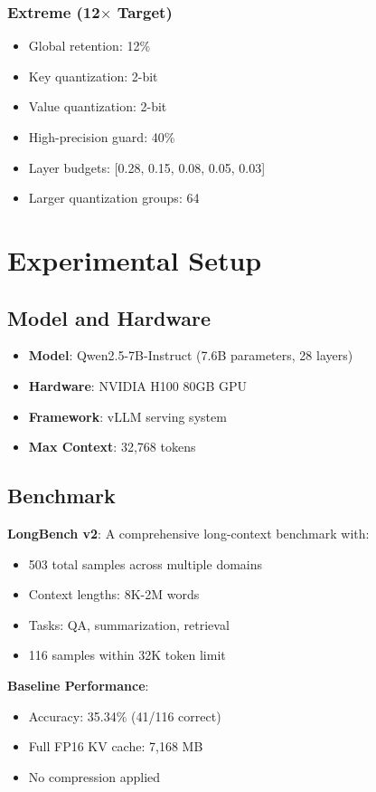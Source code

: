 \documentclass{article}
\begin{document}
\subsubsection{Extreme (12$\times$ Target)}
\begin{itemize}
\item Global retention: 12\%
\item Key quantization: 2-bit
\item Value quantization: 2-bit
\item High-precision guard: 40\%
\item Layer budgets: [0.28, 0.15, 0.08, 0.05, 0.03]
\item Larger quantization groups: 64
\end{itemize}

\section{Experimental Setup}

\subsection{Model and Hardware}

\begin{itemize}
\item \textbf{Model}: Qwen2.5-7B-Instruct (7.6B parameters, 28 layers)
\item \textbf{Hardware}: NVIDIA H100 80GB GPU
\item \textbf{Framework}: vLLM serving system
\item \textbf{Max Context}: 32,768 tokens
\end{itemize}

\subsection{Benchmark}

\textbf{LongBench v2}: A comprehensive long-context benchmark with:
\begin{itemize}
\item 503 total samples across multiple domains
\item Context lengths: 8K-2M words
\item Tasks: QA, summarization, retrieval
\item 116 samples within 32K token limit
\end{itemize}

\textbf{Baseline Performance}:
\begin{itemize}
\item Accuracy: 35.34\% (41/116 correct)
\item Full FP16 KV cache: 7,168 MB
\item No compression applied
\end{itemize}
\end{document}
